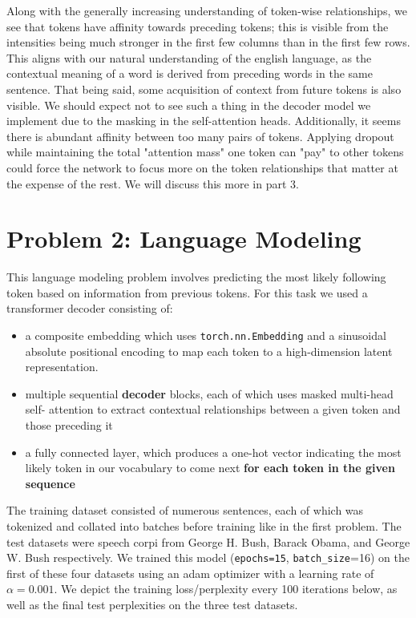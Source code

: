 \documentclass[10pt]{article}
\newcommand{\code}[1]{\texttt{#1}}
\theoremstyle{definition}
\begin{document}
\noindent Along with the generally increasing understanding of token-wise relationships, we see that tokens have affinity towards preceding tokens; this is visible from the intensities being much stronger in the first few columns than in the first few rows. This aligns with our natural understanding of the english language, as the contextual meaning of a word is derived from preceding words in the same sentence. That being said, some acquisition of context from future tokens is also visible. We should expect not to see such a thing in the decoder model we implement due to the masking in the self-attention heads. Additionally, it seems there is abundant affinity between too many pairs of tokens. Applying dropout while maintaining the total "attention mass" one token can "pay" to other tokens could force the network to focus more on the token relationships that matter at the expense of the rest. We will discuss this more in part 3.


\section{Problem 2: Language Modeling}
This language modeling problem involves predicting the most likely following token based on information from previous tokens. For this task we used a transformer decoder consisting of:
\begin{itemize}
    \item a composite embedding which uses \code{torch.nn.Embedding} and a sinusoidal absolute positional encoding to map each token to a high-dimension latent representation.
    \item multiple sequential \textbf{decoder} blocks, each of which uses masked multi-head self- attention to extract contextual relationships between a given token and those preceding it
    \item a fully connected layer, which produces a one-hot vector indicating the most likely token in our vocabulary to come next \textbf{for each token in the given sequence}
\end{itemize}

\noindent The training dataset consisted of numerous sentences, each of which was tokenized and collated into batches before training like in the first problem. The test datasets were speech corpi from George H. Bush, Barack Obama, and George W. Bush respectively. We trained this model (\code{epochs=15}, \code{batch\_size}=16) on the first of these four datasets using an adam optimizer with a learning rate of $\alpha = 0.001$. We depict the training loss/perplexity every 100 iterations below, as well as the final test perplexities on the three test datasets.
\end{document}
